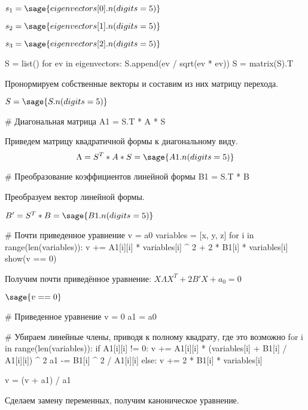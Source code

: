 \documentclass[14pt, a4paper]{extarticle}
\begin{document}
$s_1 = \sage{eigenvectors[0].n(digits=5)}$

$s_2 = \sage{eigenvectors[1].n(digits=5)}$

$s_3 = \sage{eigenvectors[2].n(digits=5)}$

\begin{sagesilent}
    S = list()
    for ev in eigenvectors:
        S.append(ev / sqrt(ev * ev))
    S = matrix(S).T
\end{sagesilent}

Пронормируем собственные векторы и составим из них матрицу перехода.

$S = \sage{S.n(digits=5)}$

\begin{sagesilent}
    # Диагональная матрица
    A1 = S.T * A * S
\end{sagesilent}

Приведем матрицу квадратичной формы к диагональному виду.
$$\Lambda = S^T * A * S = \sage{A1.n(digits=5)}$$

\begin{sagesilent}
    # Преобразование коэффициентов линейной формы
    B1 = S.T * B
\end{sagesilent}

Преобразуем вектор линейной формы.

$B' = S^T * B = \sage{B1.n(digits=5)}$

\begin{sagesilent}
    # Почти приведенное уравнение
    v = a0
    variables = [x, y, z]
    for i in range(len(variables)):
        v += A1[i][i] * variables[i] ^ 2 + 2 * B1[i] * variables[i]
    show(v == 0)
\end{sagesilent}

Получим почти приведённое уравнение: $X \Lambda X^T + 2 B' X + a_0 = 0$

$\sage{v == 0}$

\begin{sagesilent}
    # Приведенное уравнение
    v = 0
    a1 = a0

    # Убираем линейные члены, приводя к полному квадрату, где это возможно
    for i in range(len(variables)):
        if A1[i][i] != 0:
            v += A1[i][i] * (variables[i] + B1[i] / A1[i][i]) ^ 2
            a1 -= B1[i] ^ 2 / A1[i][i]
        else:
            v += 2 * B1[i] * variables[i]

    v = (v + a1) / a1
\end{sagesilent}

Сделаем замену переменных, получим каноническое уравнение.
\end{document}
